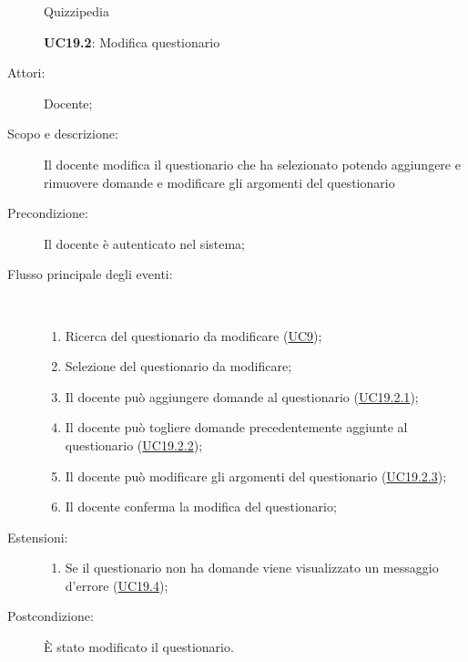 \begin{figure}[H]
	\centering
	\begin{resizedtikzpicture}{\textwidth}
		\begin{umlsystem}[x=0, fill=lightgray!20]{Quizzipedia}
		\end{umlsystem}
	\end{resizedtikzpicture}
	\caption{\textbf{UC19.2}: Modifica questionario}
	\label{UC19.2}
\end{figure}
\begin{description}
	\item[Attori:] Docente;
	\item[Scopo e descrizione:] Il docente modifica il questionario che ha selezionato potendo aggiungere e rimuovere domande e modificare gli argomenti del questionario
	\item[Precondizione:] Il docente è autenticato nel sistema;
	
	\item[Flusso principale degli eventi:] \ 
	\begin{enumerate}
		\item Ricerca del questionario da modificare (\hyperlink{UC9}{UC9});
		\item Selezione del questionario da modificare;
		\item Il docente può aggiungere domande al questionario (\hyperlink{UC19.2.1}{UC19.2.1});
		\item Il docente può togliere domande precedentemente aggiunte al questionario (\hyperlink{UC19.2.2}{UC19.2.2});
		\item Il docente può modificare gli argomenti del questionario (\hyperlink{UC19.2.3}{UC19.2.3});
		\item Il docente conferma la modifica del questionario;
		
	\end{enumerate}
	\item[Estensioni:]
	\begin{enumerate}
		\item Se il questionario non ha domande viene visualizzato un messaggio d'errore (\hyperlink{UC19.4}{UC19.4});
		
	\end{enumerate}
	\item[Postcondizione:] È stato modificato il questionario.
\end{description}
\hypertarget{UC19.2.1}{}
